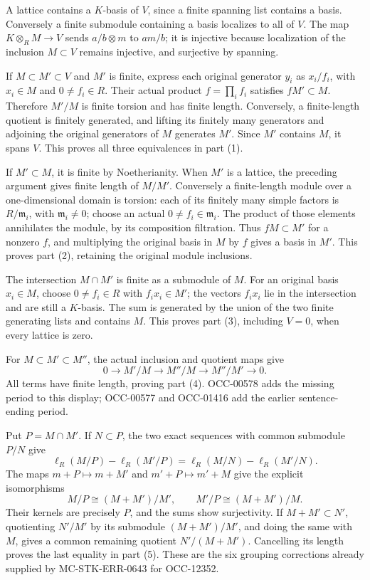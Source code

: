 A lattice contains a \(K\)-basis of \(V\), since a finite spanning list contains a basis. Conversely a finite submodule containing a basis localizes to all of \(V\). The map \(K\otimes_R M\to V\) sends \(a/b\otimes m\) to \(am/b\); it is injective because localization of the inclusion \(M\subset V\) remains injective, and surjective by spanning.

If \(M\subset M'\subset V\) and \(M'\) is finite, express each original generator \(y_i\) as \(x_i/f_i\), with \(x_i\in M\) and \(0\ne f_i\in R\). Their actual product \(f=\prod_i f_i\) satisfies \(fM'\subset M\). Therefore \(M'/M\) is finite torsion and has finite length. Conversely, a finite-length quotient is finitely generated, and lifting its finitely many generators and adjoining the original generators of \(M\) generates \(M'\). Since \(M'\) contains \(M\), it spans \(V\). This proves all three equivalences in part (1).

If \(M'\subset M\), it is finite by Noetherianity. When \(M'\) is a lattice, the preceding argument gives finite length of \(M/M'\). Conversely a finite-length module over a one-dimensional domain is torsion: each of its finitely many simple factors is \(R/\mathfrak m_i\), with \(\mathfrak m_i\ne0\); choose an actual \(0\ne f_i\in\mathfrak m_i\). The product of those elements annihilates the module, by its composition filtration. Thus \(fM\subset M'\) for a nonzero \(f\), and multiplying the original basis in \(M\) by \(f\) gives a basis in \(M'\). This proves part (2), retaining the original module inclusions.

The intersection \(M\cap M'\) is finite as a submodule of \(M\). For an original basis \(x_i\in M\), choose \(0\ne f_i\in R\) with \(f_ix_i\in M'\); the vectors \(f_ix_i\) lie in the intersection and are still a \(K\)-basis. The sum is generated by the union of the two finite generating lists and contains \(M\). This proves part (3), including \(V=0\), when every lattice is zero.

For \(M\subset M'\subset M''\), the actual inclusion and quotient maps give \[
 0\longrightarrow M'/M\longrightarrow M''/M
   \longrightarrow M''/M'\longrightarrow0.
\] All terms have finite length, proving part (4). OCC-00578 adds the missing period to this display; OCC-00577 and OCC-01416 add the earlier sentence-ending period.

Put \(P=M\cap M'\). If \(N\subset P\), the two exact sequences with common submodule \(P/N\) give \[
 \ell_R(M/P)-\ell_R(M'/P)
 =\ell_R(M/N)-\ell_R(M'/N).
\] The maps \(m+P\mapsto m+M'\) and \(m'+P\mapsto m'+M\) give the explicit isomorphisms \[
 M/P\cong(M+M')/M',\qquad M'/P\cong(M+M')/M.
\] Their kernels are precisely \(P\), and the sums show surjectivity. If \(M+M'\subset N'\), quotienting \(N'/M'\) by its submodule \((M+M')/M'\), and doing the same with \(M\), gives a common remaining quotient \(N'/(M+M')\). Cancelling its length proves the last equality in part (5). These are the six grouping corrections already supplied by MC-STK-ERR-0643 for OCC-12352.

